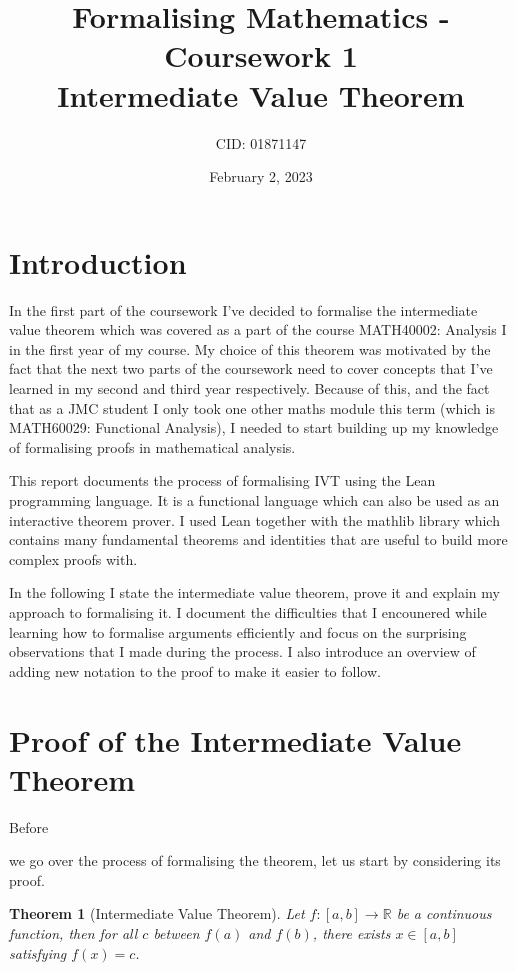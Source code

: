 \documentclass[11pt]{article}
\newcommand\R{\mathbb{R}}
\newtheorem*{theorem}{Theorem}
\begin{document}
\title{Formalising Mathematics - Coursework 1 \\ Intermediate Value Theorem}
\date{February 2, 2023}
\author{CID: 01871147}
\maketitle

\section*{ Introduction }

In the first part of the coursework I've decided to formalise the intermediate
value theorem which was covered as a part of the course MATH40002: Analysis I
in the first year of my course. My choice of this theorem was motivated by
the fact that the next two parts of the coursework need to cover concepts that
I've learned in my second and third year respectively. Because of
this, and the fact that as a JMC student I only took one other maths module this
term (which is MATH60029: Functional Analysis), I needed to start building up my
knowledge of formalising proofs in mathematical analysis.

This report documents the process of formalising IVT using the Lean programming
language. It is a functional language which can also be used as an interactive
theorem prover. I used Lean together with the mathlib library which contains many
fundamental theorems and identities that are useful to build more complex proofs
with.

In the following I state the intermediate value theorem, prove it and
explain my approach to formalising it. I document the
difficulties that I encounered while learning how to formalise arguments
efficiently and focus on the surprising observations that I made during the process.
I also introduce an overview of adding new notation to the proof to make it
easier to follow.


\section*{ Proof of the Intermediate Value Theorem }

\hypertarget{statement}{Before} we go over the process of formalising the theorem, let us start by
considering its proof.
\begin{theorem}[Intermediate Value Theorem]
  Let $f : [a, b] \to \R  $ be a continuous function, then for all $c$ between
  $f(a)$ and $f(b)$, there exists $x \in [a, b] $ satisfying $f(x) = c$.
\end{theorem}
\end{document}
